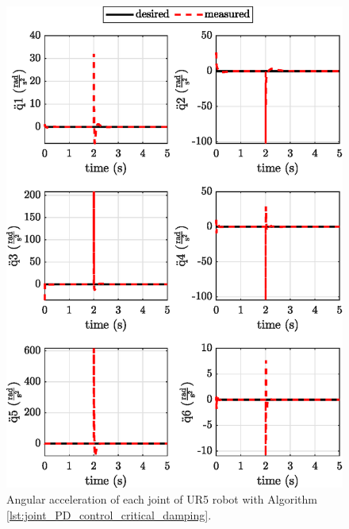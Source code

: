 \begin{figure}[H]
    \centering
    \includegraphics{images/act_1.5_step/joint_acceleration.eps}
    \caption{Angular acceleration of each joint of UR5 robot with Algorithm \ref{lst:joint_PD_control_critical_damping}.}
    \label{fig:act_1.5_joint_acceleration}
\end{figure}

